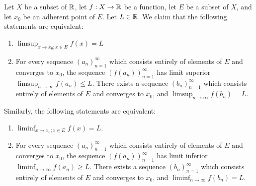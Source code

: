 \begin{ac}\label{i:ac:9.3.2}
  Let \(X\) be a subset of \(\mathbb{R}\), let \(f : X \to \mathbb{R}\) be a function, let \(E\) be a subset of \(X\), and let \(x_0\) be an adherent point of \(E\).
  Let \(L \in \mathbb{R}\).
  We claim that the following statements are equivalent:
  \begin{enumerate}
    \item \(\limsup_{x \to x_0 ; x \in E} f(x) = L\)
    \item For every sequence \((a_n)_{n = 1}^\infty\) which consists entirely of elements of \(E\) and converges to \(x_0\), the sequence \((f(a_n))_{n = 1}^\infty\) has limit superior \(\limsup_{n \to \infty} f(a_n) \leq L\).
          There exists a sequence \((b_n)_{n = 1}^\infty\) which consists entirely of elements of \(E\) and converges to \(x_0\), and \(\limsup_{n \to \infty} f(b_n) = L\).
  \end{enumerate}
  Similarly, the following statements are equivalent:
  \begin{enumerate}
    \item \(\liminf_{x \to x_0 ; x \in E} f(x) = L\).
    \item For every sequence \((a_n)_{n = 1}^\infty\) which consists entirely of elements of \(E\) and converges to \(x_0\), the sequence \((f(a_n))_{n = 1}^\infty\) has limit inferior \(\liminf_{n \to \infty} f(a_n) \geq L\).
          There exists a sequence \((b_n)_{n = 1}^\infty\) which consists entirely of elements of \(E\) and converges to \(x_0\), and \(\liminf_{n \to \infty} f(b_n) = L\).
  \end{enumerate}
\end{ac}

